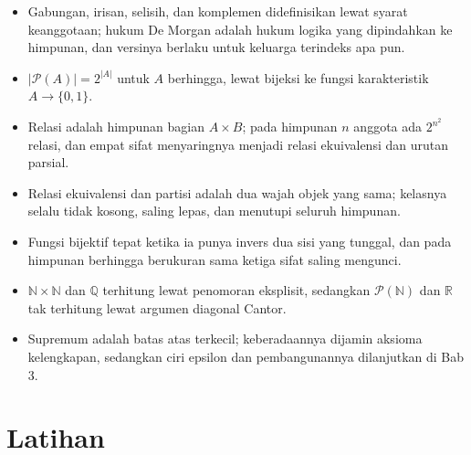\begin{ringkasan}
\begin{itemize}
  \item Gabungan, irisan, selisih, dan komplemen didefinisikan lewat syarat
        keanggotaan; hukum De Morgan adalah hukum logika yang dipindahkan ke
        himpunan, dan versinya berlaku untuk keluarga terindeks apa pun.
  \item $|\mathcal{P}(A)| = 2^{|A|}$ untuk $A$ berhingga, lewat bijeksi ke fungsi
        karakteristik $A \to \{0,1\}$.
  \item Relasi adalah himpunan bagian $A \times B$; pada himpunan $n$ anggota ada
        $2^{n^{2}}$ relasi, dan empat sifat menyaringnya menjadi relasi ekuivalensi
        dan urutan parsial.
  \item Relasi ekuivalensi dan partisi adalah dua wajah objek yang sama; kelasnya
        selalu tidak kosong, saling lepas, dan menutupi seluruh himpunan.
  \item Fungsi bijektif tepat ketika ia punya invers dua sisi yang tunggal, dan pada
        himpunan berhingga berukuran sama ketiga sifat saling mengunci.
  \item $\mathbb{N} \times \mathbb{N}$ dan $\mathbb{Q}$ terhitung lewat penomoran
        eksplisit, sedangkan $\mathcal{P}(\mathbb{N})$ dan $\mathbb{R}$ tak terhitung
        lewat argumen diagonal Cantor.
  \item Supremum adalah batas atas terkecil; keberadaannya dijamin aksioma
        kelengkapan, sedangkan ciri epsilon dan pembangunannya dilanjutkan di Bab 3.
\end{itemize}
\end{ringkasan}

\section{Latihan}

